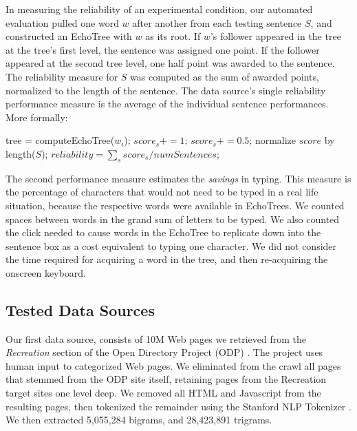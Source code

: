 \documentclass{sigchi}
\begin{document}
In measuring the reliability of an experimental condition, our
automated evaluation pulled one word $w$ after another from each
testing sentence $S$, and constructed an EchoTree with $w$ as its
root. If $w$'s follower appeared in the tree at the tree's first
level, the sentence was assigned one point. If the follower appeared
at the second tree level, one half point was awarded to the
sentence. The reliability measure for $S$ was computed as the sum of
awarded points, normalized to the length of the sentence. The data
source's single reliability performance measure is the average of the
individual sentence performances. More formally:

\begin{algorithmic}
        \STATE tree = computeEchoTree($w_i$);
            \STATE $score_s += 1$;
            \STATE $score_s += 0.5$;
        \ENDIF
     \ENDFOR
     \STATE normalize $score$ by length($S$);
  \ENDFOR
  \STATE $reliability = \sum_s score_s / numSentences$;
\end{algorithmic}            

The second performance measure estimates the {\em savings} in
typing. This measure is the percentage of characters that would not
need to be typed in a real life situation, because the respective
words were available in EchoTrees. We counted spaces between words in
the grand sum of letters to be typed. We also counted the click needed to
cause words in the EchoTree to replicate down into the sentence box as
a cost equivalent to typing one character. We did not consider the
time required for acquiring a word in the tree, and then re-acquiring
the onscreen keyboard.

\subsection{Tested Data Sources}

Our first data source, consists of 10M Web pages we retrieved from the
{\em Recreation} section of the Open Directory Project (ODP)
\cite{dmoz}. The project uses human input to categorized Web pages. We
eliminated from the crawl all pages that stemmed from the ODP site
itself, retaining pages from the Recreation target sites one level
deep. We removed all HTML and Javascript from the resulting pages,
then tokenized the remainder using the Stanford NLP Tokenizer
\cite{tokenizer}. We then extracted 5,055,284 bigrams, and 28,423,891
trigrams.
\end{document}

